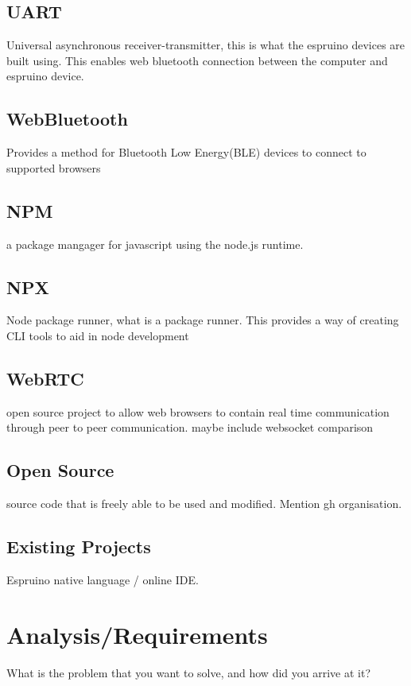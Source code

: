\documentclass{l4proj}
\begin{document}
\section{UART}
\text Universal asynchronous receiver-transmitter, this is what the espruino devices are built using. This enables web bluetooth connection between the computer and espruino device.

\section{WebBluetooth}
\text Provides a method for Bluetooth Low Energy(BLE) devices to connect to supported browsers

\section{NPM}
\text a package mangager for javascript using the node.js runtime.

\section{NPX}
\text Node package runner, what is a package runner. This provides a way of creating CLI tools to aid in node development

\section{WebRTC}
\text open source project to allow web browsers to contain real time communication through peer to peer communication. maybe include websocket comparison

\section{Open Source}
\text source code that is freely able to be used and modified. Mention gh organisation.

\section{Existing Projects}
\text Espruino native language / online IDE.

\chapter{Analysis/Requirements}
What is the problem that you want to solve, and how did you arrive at it?
\end{document}
